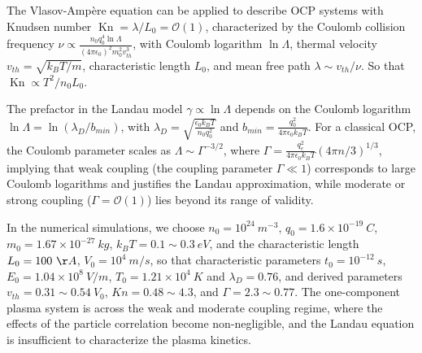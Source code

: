 \documentclass[preprint,1p,times]{elsarticle}
\DeclareMathOperator{\Kn}{Kn}
\newcommand{\cO}{\mathcal{O}}
\theoremstyle{definition}
\theoremstyle{remark}
\begin{document}
The Vlasov-Amp\`ere equation can be applied to describe OCP systems with Knudsen number $\Kn = \lambda / L_{0} = \cO(1)$, characterized by the Coulomb collision frequency $\nu \propto \frac{n_{0} q_{0}^{4} \ln \Lambda}{(4\pi \epsilon_{0})^{2} m_{0}^{2} v_{th}^{3}}$, with Coulomb logarithm $\ln \Lambda$, thermal velocity $v_{th} = \sqrt{k_{B} T/m}$, characteristic length $L_{0}$, and mean free path $\lambda \sim v_{th} / \nu$.
So that $\Kn \propto T^{2}/n_{0} L_{0}$. %


The prefactor in the Landau model $\gamma \propto \ln\Lambda$ depends on the Coulomb logarithm $\ln\Lambda = \ln (\lambda_{D} / b_{min})$, with $\lambda_{D} = \sqrt{\frac{\epsilon_{0} k_{B} T}{n_{0} q_{0}^{2}}}$ and $b_{min} = \frac{q_{0}^{2}}{4\pi \epsilon_{0} k_{B} T}$.
For a classical OCP, the Coulomb parameter scales as $\Lambda \sim \Gamma^{-3/2}$, where $\Gamma = \frac{q_e^2}{4\pi \epsilon_0 k_B T}(4\pi n/3)^{1/3}$, implying that weak coupling (the coupling parameter $\Gamma \ll 1$) corresponds to large Coulomb logarithms and justifies the Landau approximation, while moderate or strong coupling ($\Gamma = \cO(1)$) lies beyond its range of validity.


In the numerical simulations, we choose $n_{0}=10^{24} ~ m^{-3}$, $q_{0} = 1.6 \times 10^{-19} ~ C$, $m_{0} = 1.67 \times 10^{-27} ~ kg$, $k_{B} T = 0.1 \sim 0.3 ~ eV$, and the characteristic length $L_{0} = 100 ~ \AA$, $V_{0} = 10^{4} ~ m/s$, 
so that characteristic parameters $t_{0} = 10^{-12} ~ s$, $E_{0} = 1.04 \times 10^{8} ~ V/m$, $T_{0} = 1.21 \times 10^{4} ~ K$ and $\lambda_{D} = 0.76$,
and derived parameters $v_{th} = 0.31 \sim 0.54 ~ V_{0}$, $Kn = 0.48 \sim 4.3$, and $\Gamma = 2.3 \sim 0.77$.
The one-component plasma system is across the weak and moderate coupling regime, where the effects of the particle correlation become non-negligible, and the Landau equation is insufficient to characterize the plasma kinetics.

\end{document}
